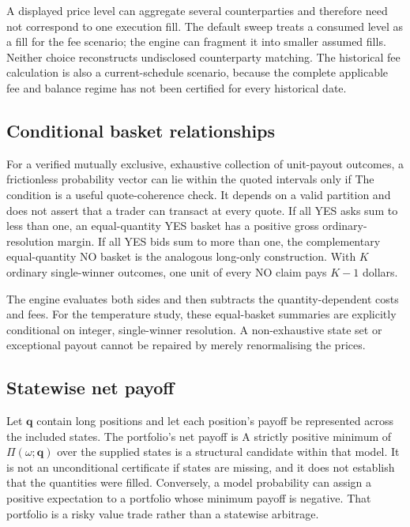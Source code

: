 
A displayed price level can aggregate several counterparties and therefore need not correspond to one execution fill. The default sweep treats a consumed level as a fill for the fee scenario; the engine can fragment it into smaller assumed fills. Neither choice reconstructs undisclosed counterparty matching. The historical fee calculation is also a current-schedule scenario, because the complete applicable fee and balance regime has not been certified for every historical date.

\label{sec:arbitrage}
\subsection{Conditional basket relationships}
For a verified mutually exclusive, exhaustive collection of unit-payout outcomes, a frictionless probability vector can lie within the quoted intervals only if
The condition is a useful quote-coherence check. It depends on a valid partition and does not assert that a trader can transact at every quote. If all YES asks sum to less than one, an equal-quantity YES basket has a positive gross ordinary-resolution margin. If all YES bids sum to more than one, the complementary equal-quantity NO basket is the analogous long-only construction. With $K$ ordinary single-winner outcomes, one unit of every NO claim pays $K-1$ dollars.

The engine evaluates both sides and then subtracts the quantity-dependent costs and fees. For the temperature study, these equal-basket summaries are explicitly conditional on integer, single-winner resolution. A non-exhaustive state set or exceptional payout cannot be repaired by merely renormalising the prices.

\needspace{145pt}\subsection{Statewise net payoff}
Let $\mathbf q$ contain long positions and let each position's payoff be represented across the included states. The portfolio's net payoff is
A strictly positive minimum of $\Pi(\omega;\mathbf q)$ over the supplied states is a structural candidate within that model. It is not an unconditional certificate if states are missing, and it does not establish that the quantities were filled. Conversely, a model probability can assign a positive expectation to a portfolio whose minimum payoff is negative. That portfolio is a risky value trade rather than a statewise arbitrage.

